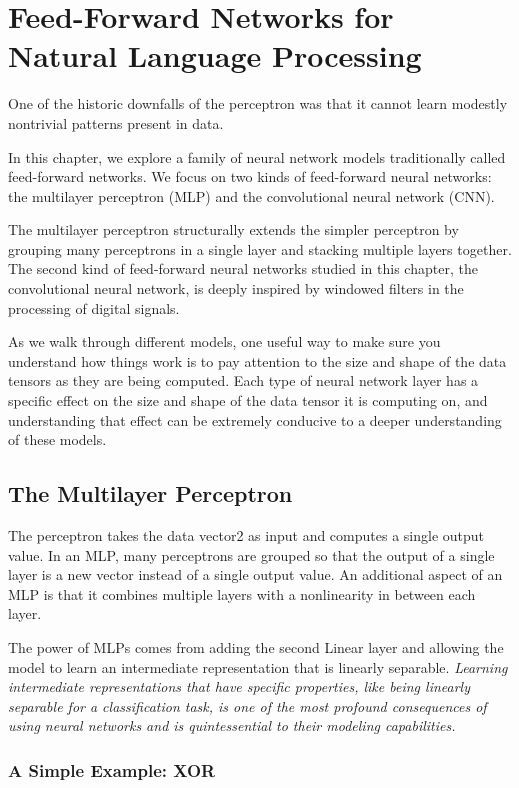 \chapter{Feed-Forward Networks for Natural Language Processing\label{Ch04}}
One of the historic downfalls of the perceptron was that it cannot learn modestly nontrivial patterns present in data.

In this chapter, we explore a family of neural network models traditionally called feed-forward networks. We focus on two kinds of feed-forward neural networks: the multilayer perceptron (MLP) and the convolutional neural network (CNN).

The multilayer perceptron structurally extends the simpler perceptron by grouping many perceptrons in a single layer and stacking multiple layers together. The second kind of feed-forward neural networks studied in this chapter, the convolutional neural network, is deeply inspired by windowed filters in the processing of digital signals.

As we walk through different models, one useful way to make sure you understand how things work is to pay attention to the size and shape of the data tensors as they are being computed. Each type of neural network layer has a specific effect on the size and shape of the data tensor it is computing on, and understanding that effect can be extremely conducive to a deeper understanding of these models.

\section{The Multilayer Perceptron}
The perceptron takes the data vector2 as input and computes a single output value. In an MLP, many perceptrons are grouped so that the output of a single layer is a new vector instead of a single output value. An additional aspect of an MLP is that it combines multiple layers with a nonlinearity in between each layer.

The power of MLPs comes from adding the second Linear layer and allowing the model to learn an intermediate representation that is linearly separable. \textit{Learning intermediate representations that have specific properties, like being linearly separable for a classification task, is one of the most profound consequences of using neural networks and is quintessential to their modeling capabilities.}
\subsection{A Simple Example: XOR}
